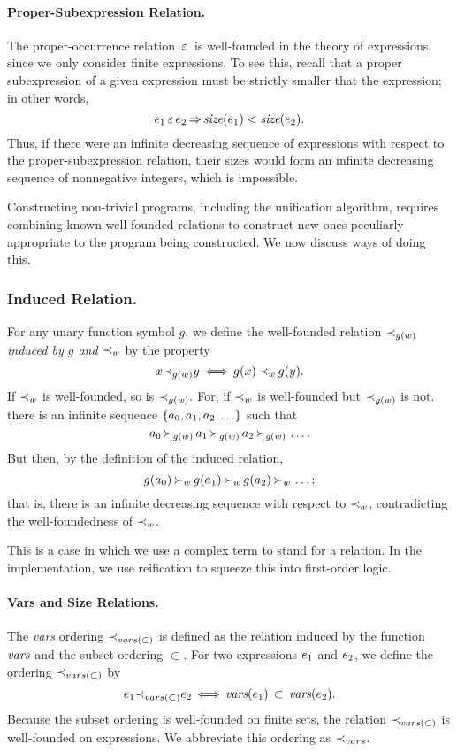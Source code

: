 \documentclass[runningheads]{llncs}
\DeclareMathOperator{\uimplies}{\Rightarrow}
\DeclareMathOperator{\uiff}{\iff}
\begin{document}
 \paragraph{Proper-Subexpression Relation.} The proper-occurrence relation $\, \varepsilon \,$ is well-founded in the theory of expressions, since we only consider finite expressions.  To see this, recall that a proper subexpression of a given expression must be strictly smaller that the expression; in other words, 
  \[\e{1} \occursin \e{2} \uimplies \size(\e{1})  < \size(\e{2}).\]
 \noindent Thus, if there were an infinite decreasing sequence of expressions with respect to the proper-subexpression relation, their sizes would form an infinite decreasing sequence of nonnegative integers, which is impossible.



 Constructing non-trivial programs, including the unification algorithm, requires combining known well-founded relations to construct new ones peculiarly appropriate to the program being constructed. We now discuss ways of doing this.
     \subsubsection{Induced Relation.} For any unary function symbol $g$, we define the well-founded relation ${\prec}_{g(w)}$ \emph{induced by $g$ and ${\prec}_{w}$} by the property
 \[\var{x} \expsub{\prec}{g(w)} \var{y} \uiff g(\var{x}) \, \expsub{\prec}{w} \, g(\var{y}).\]
 \noindent If ${\prec}_{w}$ is well-founded, so is  ${\prec}_{g(w)}.$  For, if ${\prec}_{w}$ is well-founded but ${\prec}_{g(w)}$ is not.   there is an infinite sequence $\{{a}_{0}, {a}_{1}, {a}_{2}, \ldots \}$ such that  \[{a}_{0} \, {\succ}_{g(w)} \, {a}_{1} \, {\succ}_{g(w)} \, {a}_{2} \, {\succ}_{g(w)} \,\ldots .\]  But then, by the definition of the induced relation,  \[g({a}_{0}) \, {\succ}_{w} \, g({a}_{1}) \, {\succ}_{w} \, g({a}_{2}) \, {\succ}_{w} \,\ldots;\] that is, there is an infinite decreasing sequence with respect to ${\prec}_{w}$, contradicting the well-foundedness of ${\prec}_{w}$.

 This is a case in which we use a complex term to stand for a relation.  In the implementation, we use reification to squeeze this into first-order logic. 

 \paragraph{Vars and Size Relations.} The \emph{vars} ordering ${\prec}_{vars(\subset)}$  is defined as the relation induced by the function $\emph{vars}$ and the subset ordering $\subset.$  For two expressions $e_{1}$ and $e_{2}$, we define the ordering ${\prec}_{vars(\subset)}$ by 
\[   \expsub{e}{1}    \expsub{\prec}{vars(\subset)} \expsub{e}{2} \uiff \vars(\expsub{e}{1}) \, \subset \, \vars(\expsub{e}{2}).\]
\noindent Because the subset ordering is well-founded on finite sets, the relation ${\prec}_{vars(\subset)}$ is well-founded on expressions.  
We abbreviate this ordering as ${\prec}_{vars}$.
\end{document}
